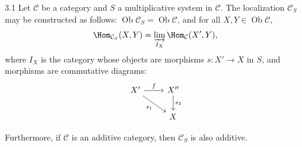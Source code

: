 \begin{bookproposition}{3.1}\label{prop:1.3.1}
Let $\mathcal{C}$ be a category and $S$ a multiplicative system in $\mathcal{C}$. The localization $\mathcal{C}_S$ may be constructed as follows:
$\operatorname{Ob}\mathcal{C}_S = \operatorname{Ob}\mathcal{C}$, and for all $X,Y\in\operatorname{Ob}\mathcal{C}$,
\[
\Hom_{\mathcal{C}_S}(X,Y) = \varinjlim_{I_X} \Hom_{\mathcal{C}}(X',Y),
\]
where $I_X$ is the category whose objects are morphisms $s\colon X'\to X$ in $S$, and morphisms are commutative diagrams:
\[
\begin{tikzcd}
	X' \arrow[dr, "s_1"'] \arrow[r, "f"] & X'' \arrow[d, "s_2"] \\
	& X
\end{tikzcd}
\]

Furthermore, if $\mathcal{C}$ is an additive category, then $\mathcal{C}_S$ is also additive.
\end{bookproposition}

